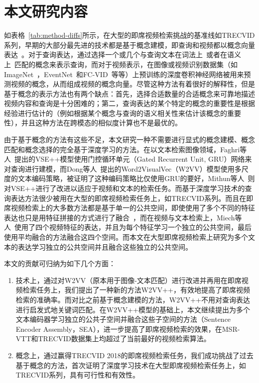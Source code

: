 \section{本文研究内容}
如表格~\ref{tab:method-diffs}所示，在大型的即席视频检索挑战的基准线如TRECVID系列，早期的大部分最先进的技术都是基于概念建模，即查询和视频都以概念向量表达~\cite{le2016nii,foteini2016iti,nguyen2017vireo,ueki2017waseda}。对于查询表达，通过选择一个或几个与查询文本在词法上~\cite{lu2016event,ueki2017waseda}或者在语义上~\cite{markatopoulou2017query,snoek2017university}匹配的概念来表示查询，而对于视频表示，在图像或视频识别数据集（如ImageNet~\cite{deng2009imagenet}，EventNet~\cite{ye2015eventnet}和FC-VID~\cite{jiang2018exploiting}等等）上预训练的深度卷积神经网络被用来预测视频的概念，从而组成视频的概念向量。尽管这种方法有着很好的解释性，但是基于概念的表示方法也有两个缺点：首先，选择合适数量的合适概念来可靠地描述视频内容和查询是十分困难的；第二，查询表达的某个特定的概念的重要性是根据经验进行估计的（例如根据某个概念与查询的语义相关性来估计该概念的重要性），并且这种方法在跨模态的相似度计算也不是最优的。

由于基于概念的方法有这些不足，本文研究一种不需要进行显式的概念建模、概念匹配和概念选择的完全基于深度学习的方法。在以文本检索图像领域，Faghri等人~\cite{faghri2017vse++}提出的VSE++模型使用门控循环单元（Gated Recurrent Unit, GRU）网络来对查询进行建模，而Dong等人~\cite{dong2018predicting}提出的Word2VisualVec（W2VV）模型使用多尺度的文本编码策略，被证明了这种编码策略比仅使用GRU的要好，Mithun等人~\cite{mithun2018learning}则对VSE++进行了改进以适应于视频和文本的检索任务。而基于深度学习技术的查询表达方法很少被用在大型的即席视频检索任务上，如TRECVID系列。而且在即席视频检索上的大多数方法都是基于单一的公共空间，即使使用了多个不同的特征表达也只是用特征拼接的方式进行了融合~\cite{li2018renmin,wu2019hybrid}，而在视频与文本检索上，Miech等人~\cite{miech2018learning}使用了四个视频特征的表达，并且为每个特征学习一个独立的公共空间，最后使用平均融合的方法融合这四个空间。而本文在大型即席视频检索上研究为多个文本的表达学习独立的公共空间并且融合这些独立的公共空间。

本文的贡献可归纳为如下几个方面：
\begin{enumerate}[1.]
\item 技术上，通过对W2VV（原本用于图像-文本匹配）进行改进并再用在即席视频检索任务上，我们提出了一种新的方法W2VV++，有效地提高了即席视频检索的准确率。而对比之前基于概念建模的方法，W2VV++不用对查询表达进行启发式地关键词匹配。在W2VV++模型的基础上，本文继续提出为多个文本编码器学习独立的公共子空间并融合这些子空间的方法（Sentence Encoder Assembly，SEA），进一步提高了即席视频检索的效果，在MSR-VTT和TRECVID数据集上均超过了当前最好的视频检索算法。

\item 概念上，通过赢得TRECVID 2018的即席视频检索任务，我们成功挑战了过去基于概念的方法，首次证明了深度学习技术在大型即席视频检索任务上，如TRECVID系列，具有可行性和有效性。

\end{enumerate}

